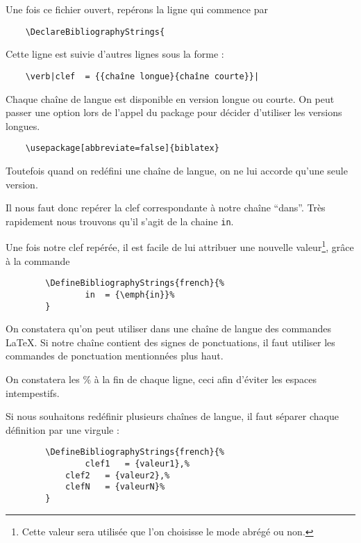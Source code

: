 	Une fois ce fichier ouvert, repérons la ligne qui commence par
	
	\begin{verbatim}
	\DeclareBibliographyStrings{
	\end{verbatim}
	
	Cette ligne est suivie d'autres lignes sous la forme :
	
	\begin{verbatim}
	\verb|clef	= {{chaîne longue}{chaîne courte}}|
	\end{verbatim}
	
	\begin{anedocte}
	Chaque chaîne de langue est disponible en version longue ou courte. On peut passer une option lors de l'appel du package  pour décider d'utiliser les versions longues.
	
	\begin{verbatim}
	\usepackage[abbreviate=false]{biblatex}
	\end{verbatim}
	
	 Toutefois quand on redéfini une chaîne de langue, on ne lui accorde qu'une seule version.
	
		

	\end{anedocte}
	Il nous faut donc repérer la clef correspondante à notre chaîne \enquote{dans}. Très rapidement nous trouvons qu'il s'agit de la chaine \verb|in|.
	
	Une fois  notre clef repérée, il est facile de lui attribuer une nouvelle valeur\footnote{Cette valeur sera utilisée que l'on choisisse le mode abrégé ou non.}, grâce à la commande 
	
	\begin{verbatim}
		\DefineBibliographyStrings{french}{%
      		  	in 	= {\emph{in}}%
		}
	\end{verbatim}
	
	On constatera qu'on peut utiliser dans une chaîne de langue des commandes \LaTeX. Si notre chaîne contient des signes de ponctuations, il faut utiliser les commandes de ponctuation mentionnées plus haut.
	
	On constatera les \% à la fin de chaque ligne, ceci afin d'éviter les espaces intempestifs.
	
	Si nous souhaitons redéfinir plusieurs chaînes de langue, il faut séparer chaque définition par une virgule :
	
	\begin{verbatim}
		\DefineBibliographyStrings{french}{%
      		  	clef1 	= {valeur1},%
			clef2	= {valeur2},%
			clefN	= {valeurN}%
		}
	\end{verbatim}
	
	
	